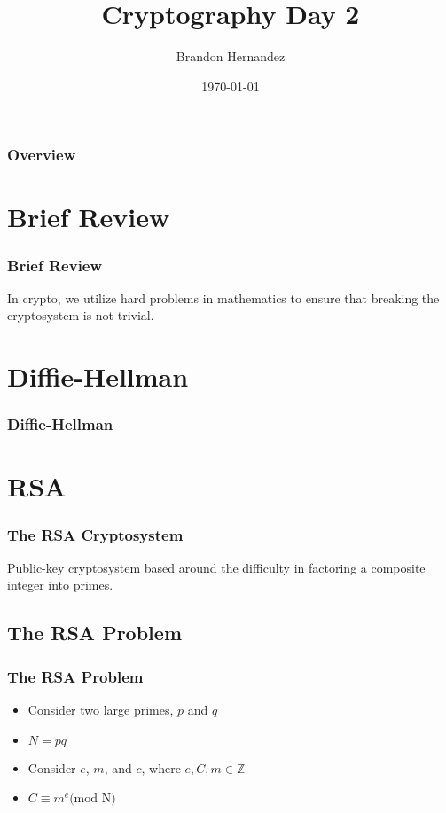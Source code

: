 \documentclass{beamer}
\title[Cryptography Day 2]{\huge \textbf{Cryptography Day 2}} %
\author{Brandon Hernandez} %
\date{\today} %
\begin{document}
\begin{frame}
    \titlepage %
\end{frame}


\begin{frame}
    \frametitle{Overview} %
    \tableofcontents %
\end{frame}

\section{Brief Review}
\begin{frame}
    \frametitle{Brief Review}
    In crypto, we utilize hard problems in mathematics to ensure that breaking the cryptosystem is not trivial.
\end{frame}

\section{Diffie-Hellman}
\begin{frame}
    \frametitle{Diffie-Hellman}
\end{frame}


\section{RSA}
\begin{frame}
    \frametitle{The RSA Cryptosystem}
    Public-key cryptosystem based around the difficulty in factoring a composite integer into primes.

\end{frame}
\subsection{The RSA Problem}
\begin{frame}
    \frametitle{The RSA Problem}
    \begin{itemize}
        \item Consider two large primes, $p$ and $q$
        \item $N = pq$
        \item Consider $e$, $m$, and $c$, where $e,C, m \in \mathbb{Z}$
        \item $C \equiv m^{e} \textrm{(mod N)}$
    \end{itemize}
\end{frame}
\end{document}
